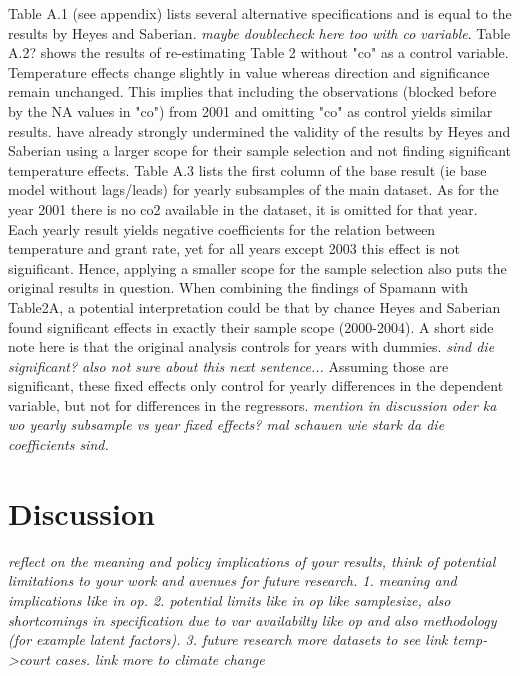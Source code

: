\documentclass[11pt]{article}
\begin{document}
	Table A.1 (see appendix) lists several alternative specifications and is equal to the results by Heyes and Saberian. \textit{maybe doublecheck here too with co variable}.
	Table A.2? shows the results of re-estimating Table 2 without "co" as a control variable. Temperature effects change slightly in value whereas direction and significance remain unchanged. This implies that including the observations (blocked before by the NA values in "co") from 2001 and omitting "co" as control yields similar results.
	\cite{Spamann.2020} have already strongly undermined the validity of the results by Heyes and Saberian using a larger scope for their sample selection and not finding significant temperature effects. Table A.3 lists the first column of the base result (ie base model without lags/leads) for yearly subsamples of the main dataset. As for the year 2001 there is no co2 available in the dataset, it is omitted for that year. Each yearly result yields negative coefficients for the relation between temperature and grant rate, yet for all years except 2003 this effect is not significant. Hence, applying a smaller scope for the sample selection also puts the original results in question. When combining the findings of Spamann with Table2A, a potential interpretation could be that by chance Heyes and Saberian found significant effects in exactly their sample scope (2000-2004). A short side note here is that the original analysis controls for years with dummies. \textit{sind die significant? also not sure about this next sentence...} Assuming those are significant, these fixed effects only control for yearly differences in the dependent variable, but not for differences in the regressors. \textit{mention in discussion oder ka wo yearly subsample vs year fixed effects? mal schauen wie stark da die coefficients sind.}
	
	\section{Discussion}
	\textit{reflect on the meaning and policy implications of your results, think of potential limitations to your work and avenues for future research.
		1. meaning and implications like in op. 
		2. potential limits like in op like samplesize, also shortcomings in specification due to var availabilty like op and also methodology (for example latent factors).
		3. future research more datasets to see link temp->court cases. link more to climate change
	}
	
\end{document}

